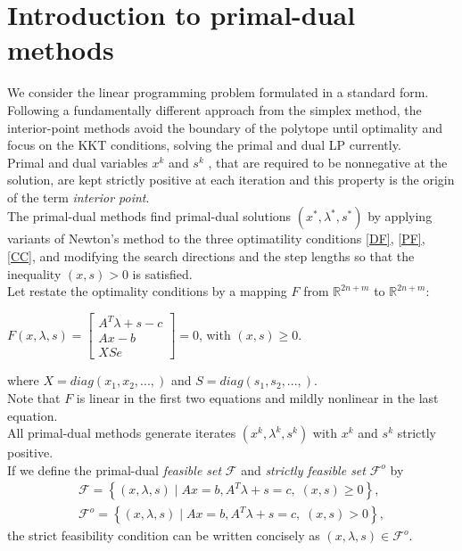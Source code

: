 \documentclass[a4paper,10 pt,titlepage,twoside]{book}
\theoremstyle{plain}
\theoremstyle{definition}
\theoremstyle{remark}
\begin{document}
\section{Introduction to primal-dual methods}
We consider the linear programming problem formulated in a standard form. \\
Following a fundamentally different approach from the simplex method, the interior-point methods avoid the boundary of the polytope until optimality and focus on the KKT conditions, solving the primal and dual LP currently.\\
Primal and dual variables  $x^{k}$ and $s^{k}$ , that are required to be nonnegative at the solution, are kept strictly positive at each iteration and this property is the origin of the term \textit{interior point}.\\
The primal-dual methods find primal-dual solutions $(x^{*},\lambda^{*},s^{*})$ by applying variants of Newton's method to the three optimatility conditions \ref{DF}, \ref{PF}, \ref{CC}, and modifying the search directions and the step lengths so that the inequality $(x,s)>0$ is satisfied.\\
 Let restate the optimality conditions by a mapping $\mathit{F}$ from $\mathbb{R}^{2n+m}$ to $\mathbb{R}^{2n+m}$:
\begin{center}\label{F}
	$\mathit{F}(x,\lambda,s)= \begin{bmatrix}
	A^{T}\lambda+s-c \\Ax-b \\XSe
	\end{bmatrix}=0$, with $(x,s)\geq0.$
\end{center}
where $X = diag(x_{1}, x_{2},...,)$ and $S = diag(s_{1}, s_{2},...,)$.\\ Note that $\mathit{F}$ is linear in the first two equations and mildly nonlinear in the last equation. \\ All primal-dual methods generate iterates $(x^{k},\lambda^{k},s^{k})$ with $x^{k}$ and $s^{k}$ strictly positive.\\
If we define the primal-dual \textit{feasible set} $\mathcal{F}$ and \textit{strictly feasible set} $\mathcal{F}^{o}$ by
\begin{align*}
\mathcal{F} = \left\lbrace(x,\lambda,s)\;|\;Ax = b, A^{T}\lambda+s =c,\;(x,s)\geq0\right\rbrace, \\
\mathcal{F}^{o} = \left\lbrace(x,\lambda,s)\;|\;Ax = b, A^{T}\lambda+s =c,\;(x,s)>0\right\rbrace, 
\end{align*}
the strict feasibility condition can be written concisely as $(x,\lambda,s)\in\mathcal{F}^{o}$.\\
\end{document}
